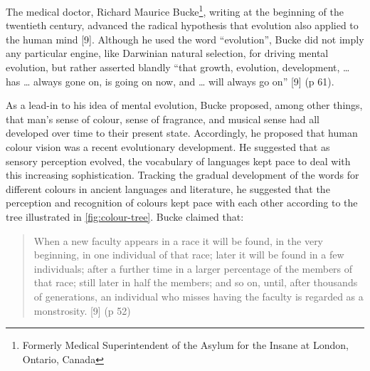 \documentclass[
  12pt,
  british,
  a4paper,
]{article}
\begin{document}
The medical doctor, Richard Maurice Bucke\footnote{Formerly Medical
  Superintendent of the Asylum for the Insane at London, Ontario, Canada},
writing at the beginning of the twentieth century, advanced the radical
hypothesis that evolution also applied to the human mind {[}9{]}.
Although he used the word ``evolution'', Bucke did not imply any
particular engine, like Darwinian natural selection, for driving mental
evolution, but rather asserted blandly ``that growth, evolution,
development, \ldots{} has \ldots{} always gone on, is going on now, and
\ldots{} will always go on'' {[}9{]} (p 61).

As a lead-in to his idea of mental evolution, Bucke proposed, among
other things, that man's sense of colour, sense of fragrance, and
musical sense had all developed over time to their present state.
Accordingly, he proposed that human colour vision was a recent
evolutionary development. He suggested that as sensory perception
evolved, the vocabulary of languages kept pace to deal with this
increasing sophistication. Tracking the gradual development of the words
for different colours in ancient languages and literature, he suggested
that the perception and recognition of colours kept pace with each other
according to the tree illustrated in \cref{fig:colour-tree}. Bucke
claimed that:

\begin{quote}
When a new faculty appears in a race it will be found, in the very
beginning, in one individual of that race; later it will be found in a
few individuals; after a further time in a larger percentage of the
members of that race; still later in half the members; and so on, until,
after thousands of generations, an individual who misses having the
faculty is regarded as a monstrosity. {[}9{]} (p 52)
\end{quote}
\end{document}
